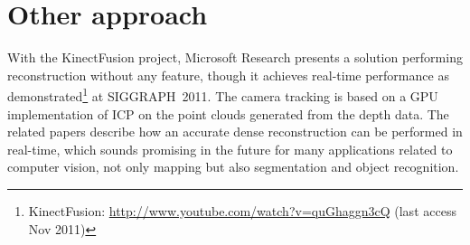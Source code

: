 \section{Other approach}

With the KinectFusion project, Microsoft Research presents a solution performing reconstruction without any feature, though it achieves real-time performance as demonstrated\footnote{KinectFusion: \url{http://www.youtube.com/watch?v=quGhaggn3cQ} (last access Nov 2011)} at SIGGRAPH~2011. The camera tracking is based on a GPU implementation of \gls{ICP} on the point clouds generated from the depth data. The related papers \cite{Izadi_2011_SIGGRAPH} \cite{Newcombe_2011_ISMAR} describe how an accurate dense reconstruction can be performed in real-time, which sounds promising in the future for many applications related to computer vision, not only mapping but also segmentation and object recognition.
